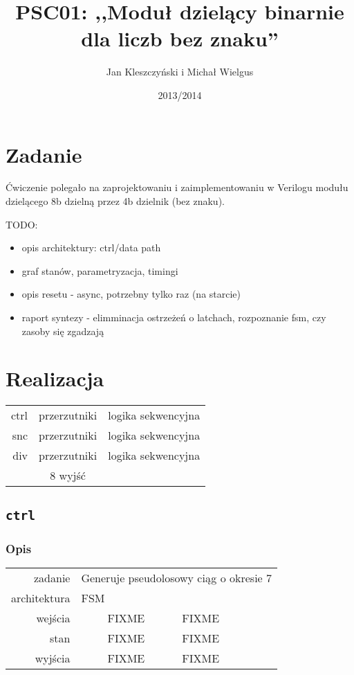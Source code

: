 \documentclass[a4paper]{article}
\author{Jan Kleszczyński i Michał Wielgus}
\title{PSC01: ,,Moduł dzielący binarnie dla liczb bez znaku''}
\date{2013/2014}
\begin{document}
\maketitle
\tableofcontents
\listoffigures
\listoftables
\clearpage
\setcounter{page}{1} 
\section{Zadanie}
Ćwiczenie polegało na zaprojektowaniu i zaimplementowaniu w Verilogu modułu dzielącego 8b dzielną przez 4b dzielnik (bez znaku).

TODO:
\begin{itemize}
	\item opis architektury: ctrl/data path
	\item graf stanów, parametryzacja, timingi
	\item opis resetu - async, potrzebny tylko raz (na starcie)
	\item raport syntezy - elimminacja ostrzeżeń o latchach, rozpoznanie fsm, czy zasoby się zgadzają
\end{itemize}
\section{Realizacja}

\begin{table}[!h]
	\centering
	\begin{tabular}{r||c|l}
		ctrl  & przerzutniki & logika sekwencyjna  \\
		snc   & przerzutniki & logika sekwencyjna  \\
		div   & przerzutniki & logika sekwencyjna  \\
		\hline\hline
		            & 8 wyjść   &  \\
	\end{tabular}
\end{table}

\clearpage
\subsection{\texttt{ctrl}}
\subsubsection{Opis}
\begin{table}[!h]
	\begin{tabular}{r|c l}
		zadanie      & \multicolumn{2}{l}{Generuje pseudolosowy ciąg o okresie 7}\\
		architektura & \multicolumn{2}{l}{FSM}                                   \\
		wejścia      & FIXME       & FIXME                                       \\
		stan         & FIXME       & FIXME                                       \\
		wyjścia      & FIXME       & FIXME                                       \\
	\end{tabular}
\end{table}
\end{document}
